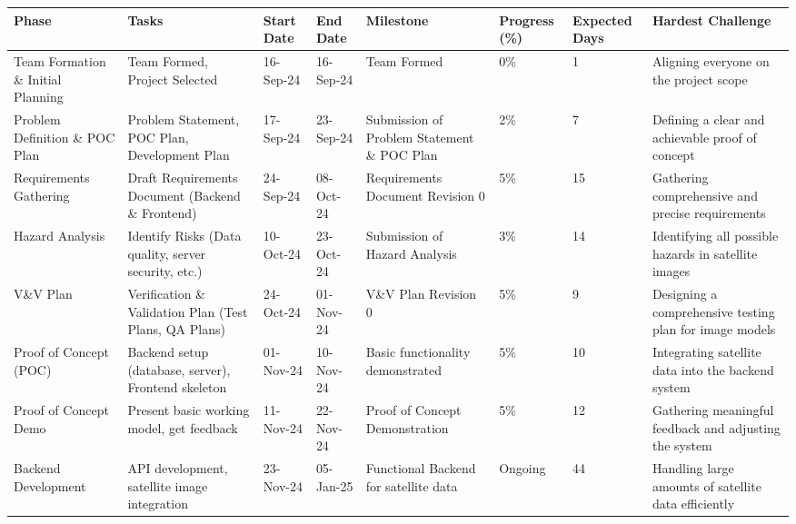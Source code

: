 \documentclass{article}
\begin{document}
\begin{table}[h!]
  \centering
  \setlength{\arrayrulewidth}{1pt}
  \begin{adjustbox}{max width=\textwidth}
  \begin{tabular}{|p{3cm}|p{5cm}|p{2.5cm}|p{2.5cm}|p{4cm}|p{2cm}|p{2.5cm}|p{4cm}|}
  \hline
  \rowcolor{headerblue}
  \textbf{\color{white}Phase} & \textbf{\color{white}Tasks} & \textbf{\color{white}Start Date} & \textbf{\color{white}End Date} & \textbf{\color{white}Milestone} & \textbf{\color{white}Progress (\%)} & \textbf{\color{white}Expected Days} & \textbf{\color{white}Hardest Challenge} \\ \hline
  Team Formation \& Initial Planning & Team Formed, Project Selected & 16-Sep-24 & 16-Sep-24 & Team Formed & 0\% & 1 & Aligning everyone on the project scope \\ \hline
  Problem Definition \& POC Plan & Problem Statement, POC Plan, Development Plan & 17-Sep-24 & 23-Sep-24 & Submission of Problem Statement \& POC Plan & 2\% & 7 & Defining a clear and achievable proof of concept \\ \hline
  Requirements Gathering & Draft Requirements Document (Backend \& Frontend) & 24-Sep-24 & 08-Oct-24 & Requirements Document Revision 0 & 5\% & 15 & Gathering comprehensive and precise requirements \\ \hline
  Hazard Analysis & Identify Risks (Data quality, server security, etc.) & 10-Oct-24 & 23-Oct-24 & Submission of Hazard Analysis & 3\% & 14 & Identifying all possible hazards in satellite images \\ \hline
  V\&V Plan & Verification \& Validation Plan (Test Plans, QA Plans) & 24-Oct-24 & 01-Nov-24 & V\&V Plan Revision 0 & 5\% & 9 & Designing a comprehensive testing plan for image models \\ \hline
  Proof of Concept (POC) & Backend setup (database, server), Frontend skeleton & 01-Nov-24 & 10-Nov-24 & Basic functionality demonstrated & 5\% & 10 & Integrating satellite data into the backend system \\ \hline
  Proof of Concept Demo & Present basic working model, get feedback & 11-Nov-24 & 22-Nov-24 & Proof of Concept Demonstration & 5\% & 12 & Gathering meaningful feedback and adjusting the system \\ \hline
  Backend Development & API development, satellite image integration & 23-Nov-24 & 05-Jan-25 & Functional Backend for satellite data & Ongoing & 44 & Handling large amounts of satellite data efficiently \\ \hline

\end{tabular}
\end{adjustbox}
\end{table}
\end{document}
